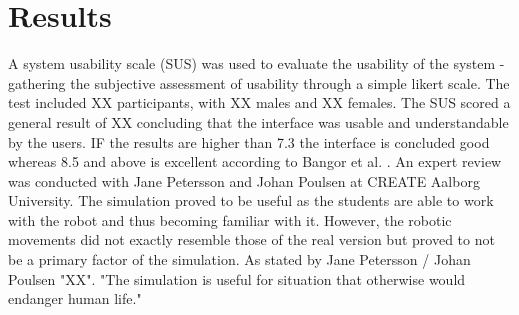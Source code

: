 \section{Results}
A system usability scale (SUS) was used to evaluate the usability of the system - gathering the subjective assessment of usability through a simple likert scale. The test included XX participants, with XX males and XX females. The SUS scored a general result of XX concluding that the interface was usable and understandable by the users. IF the results are higher than 7.3 the interface is concluded good whereas 8.5 and above is excellent according to Bangor et al. \citep{bangor_empirical_2008}.
An expert review was conducted with Jane Petersson and Johan Poulsen at CREATE Aalborg University. The simulation proved to be useful as the students are able to work with the robot and thus becoming familiar with it. However, the robotic movements did not exactly resemble those of the real version but proved to not be a primary factor of the simulation. As stated by Jane Petersson / Johan Poulsen "XX". "The simulation is useful for situation that otherwise would endanger human life."